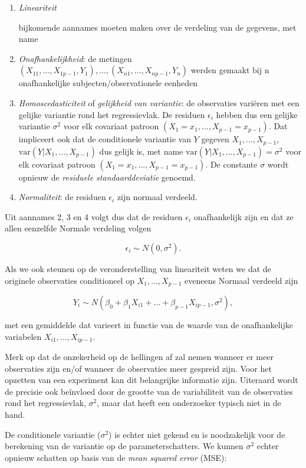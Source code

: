 \documentclass[
  12pt,dutch,coursenotes]{book}
\theoremstyle{definition}
\theoremstyle{definition}
\theoremstyle{definition}
\theoremstyle{definition}
\theoremstyle{remark}
\begin{document}
\begin{enumerate}
\def\labelenumi{\arabic{enumi}.}
\item
  \emph{Lineariteit}

  bijkomende aannames moeten maken over de verdeling van de gegevens, met name
\item
  \emph{Onafhankelijkheid}: de metingen \((X_{11},\dots, X_{1p-1}, Y_1), ..., (X_{n1},\ldots,X_{np-1},Y_n)\) werden gemaakt bij n onafhankelijke subjecten/observationele eenheden
\item
  \emph{Homoscedasticiteit} of \emph{gelijkheid van variantie}: de observaties variëren met een gelijke variantie rond het regressievlak. De residuen \(\epsilon_i\) hebben dus een gelijke variantie \(\sigma^2\) voor elk covariaat patroon \((X_1=x_1, ..., X_{p-1}=x_{p-1})\). Dat impliceert ook dat de conditionele variantie van \(Y\) gegeven \(X_1,\ldots,X_{p-1}\), \(\text{var}(Y\vert X_1,\ldots,X_{p-1})\) dus gelijk is, met name \(\text{var}(Y\vert X_1,\ldots,X_{p-1}) = \sigma^2\) voor elk covariaat patroon \((X_1=x_1, ..., X_{p-1}=x_{p-1})\). De constante \(\sigma\) wordt opnieuw de \emph{residuele standaarddeviatie} genoemd.
\item
  \emph{Normaliteit}: de residuen \(\epsilon_i\) zijn normaal verdeeld.
\end{enumerate}

Uit aannames 2, 3 en 4 volgt dus dat de residuen \(\epsilon_i\) onafhankelijk zijn en dat ze allen eenzelfde Normale verdeling volgen

\[\epsilon_i \sim N(0,\sigma^2).\]

Als we ook steunen op de veronderstelling van lineariteit weten we dat de originele observaties conditioneel op \(X_1,\ldots,X_{p-1}\) eveneens Normaal verdeeld zijn

\[Y_i\sim N(\beta_0+\beta_1 X_{i1}+\ldots+\beta_{p-1} X_{ip-1},\sigma^2),\]

met een gemiddelde dat varieert in functie van de waarde van de onafhankelijke variabelen \(X_{i1},\ldots,X_{ip-1}\).

Merk op dat de onzekerheid op de hellingen af zal nemen wanneer er meer observaties zijn en/of wanneer de observaties meer gespreid zijn. Voor het opzetten van een experiment kan dit belangrijke informatie zijn. Uiteraard wordt de precisie ook beïnvloed door de grootte van de variabiliteit van de observaties rond het regressievlak, \(\sigma^2\), maar dat heeft een onderzoeker typisch niet in de hand.

De conditionele variantie (\(\sigma^2\)) is echter niet gekend en is noodzakelijk voor de berekening van de variantie op de parameterschatters. We kunnen \(\sigma^2\) echter opnieuw schatten op basis van de \emph{mean squared error} (MSE):
\end{document}
